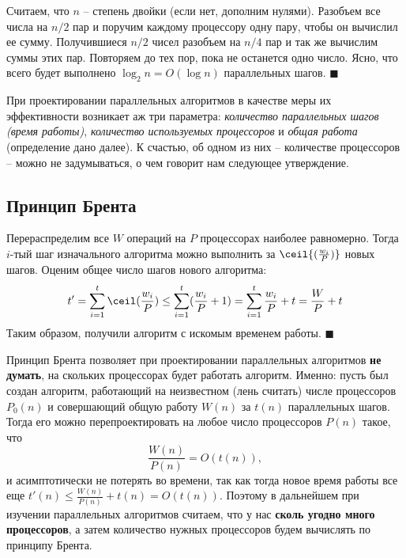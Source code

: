  Считаем, что $n$ -- степень двойки (если нет, дополним нулями).  Разобъем все числа на $n/2$ пар и поручим каждому процессору одну пару, чтобы он вычислил ее сумму. Получившиеся $n/2$ чисел разобъем на $n/4$ пар и так же вычислим суммы этих пар. Повторяем до тех пор, пока не останется одно число. Ясно, что всего будет выполнено $\log_2 n = O(\log n)$ параллельных шагов. $\blacksquare$

При проектировании параллельных алгоритмов в качестве меры их эффективности возникает аж три параметра: \textit{количество параллельных шагов (время работы)}, \textit{количество используемых процессоров} и \textit{общая работа} (определение дано далее). К счастью, об одном из них -- количестве процессоров -- можно не задумываться, о чем говорит нам следующее утверждение.

\subsection{Принцип Брента}

 Перераспределим все $W$ операций на $P$ процессорах наиболее равномерно. Тогда $i$-тый шаг изначального алгоритма можно выполнить за $\ceil{(\frac{w_i}{P})}$ новых шагов. Оценим общее число шагов нового алгоритма:
$$t' = \sum_{i=1}^t \ceil(\frac{w_i}{P}) \leq \sum_{i=1}^t (\frac{w_i}{P} + 1) = \sum_{i=1}^t \frac{w_i}{P} + t = \frac{W}{P} + t$$Таким образом, получили алгоритм с искомым временем работы. $\blacksquare$

 Принцип Брента позволяет при проектировании параллельных алгоритмов \textbf{не думать}, на скольких процессорах будет работать алгоритм. Именно: пусть был создан алгоритм, работающий на неизвестном (лень считать) числе процессоров $P_0(n)$ и совершающий общую работу $W(n)$ за $t(n)$ параллельных шагов. Тогда его можно перепроектировать на любое число процессоров $P(n)$ такое, что $$\frac{W(n)}{P(n)} = O(t(n)),$$ и асимптотически не потерять во времени, так как тогда новое время работы все еще $t'(n) \leq \frac{W(n)}{P(n)} + t(n) = O(t(n))$. Поэтому в дальнейшем при изучении параллельных алгоритмов считаем, что у нас \textbf{сколь угодно много процессоров}, а затем количество нужных процессоров будем вычислять по принципу Брента.

